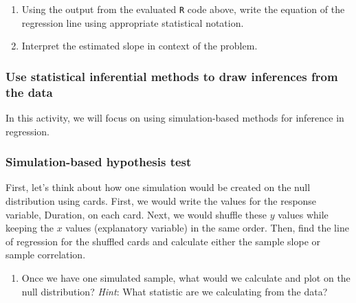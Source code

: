 \documentclass[
]{report}
\providecommand{\tightlist}{%
  \setlength{\itemsep}{0pt}\setlength{\parskip}{0pt}}
\begin{document}
\begin{enumerate}
\def\labelenumi{\arabic{enumi}.}
\setcounter{enumi}{6}
\item
  Using the output from the evaluated \texttt{R} code above, write the equation of the regression line using appropriate statistical notation.
  \vspace{1in}
\item
  Interpret the estimated slope in context of the problem.
  \vspace{1in}
\end{enumerate}

\vspace{1in}

\hypertarget{use-statistical-inferential-methods-to-draw-inferences-from-the-data-5}{%
\subsubsection*{Use statistical inferential methods to draw inferences from the data}\label{use-statistical-inferential-methods-to-draw-inferences-from-the-data-5}}

In this activity, we will focus on using simulation-based methods for inference in regression.

\hypertarget{simulation-based-hypothesis-test}{%
\subsubsection*{Simulation-based hypothesis test}\label{simulation-based-hypothesis-test}}

First, let's think about how one simulation would be created on the null distribution using cards. First, we would write the values for the response variable, Duration, on each card. Next, we would shuffle these \(y\) values while keeping the \(x\) values (explanatory variable) in the same order. Then, find the line of regression for the shuffled cards and calculate either the sample slope or sample correlation.

\begin{enumerate}
\def\labelenumi{\arabic{enumi}.}
\setcounter{enumi}{8}
\tightlist
\item
  Once we have one simulated sample, what would we calculate and plot on the null distribution? \emph{Hint}: What statistic are we calculating from the data?
\end{enumerate}
\end{document}
